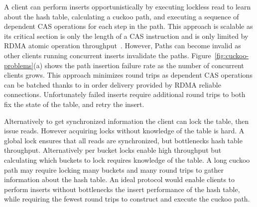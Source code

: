 A client can perform inserts opportunistically by executing
lockless read to learn about the hash table, calculating a
cuckoo path, and executing a sequence of dependent CAS
operations for each step in the path. This approach is
scalable as its critical section is only the length of a CAS
instruction and is only limited by RDMA atomic operation
throughput~\cite{design-guidelines}. However, Paths can
become invalid as other clients running concurrent inserts
invalidate the paths. Figure~\ref{fig:cuckoo-problems}(a) shows the
path insertion failure rate as the number of concurrent
clients grows. This approach minimizes round trips as
dependent CAS operations can be batched thanks to in order
delivery provided by RDMA reliable connections.
Unfortunately failed inserts require additional round trips
to both fix the state of the table, and retry the
insert.

Alternatively to get synchronized information the client can
lock the table, then issue reads. However acquiring locks
without knowledge of the table is hard. A global lock
ensures that all reads are synchronized, but bottlenecks
hash table throughput. Alternatively per bucket locks
enable high throughput but calculating which buckets to lock
requires knowledge of the table. A long cuckoo path may
require locking many buckets and many round trips to gather
information about the hash table.
An ideal protocol would enable clients to perform inserts
without bottlenecks the insert performance of the hash
table, while requiring the fewest round trips to construct
and execute the cuckoo path.


